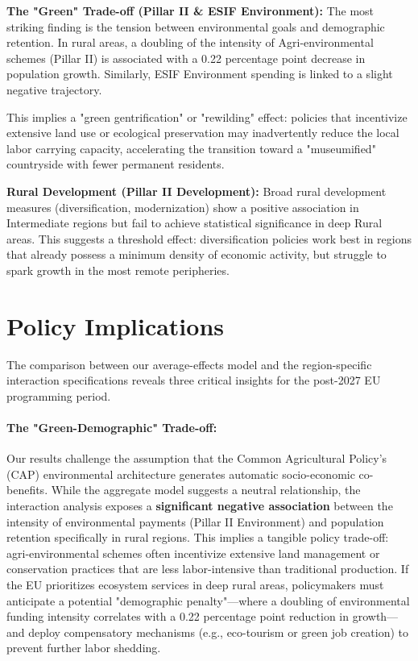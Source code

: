 \documentclass[
	a4paper, %
	10pt, %
]{LTJournalArticle}
\begin{document}
\textbf{The "Green" Trade-off (Pillar II & ESIF Environment):} The most striking finding is the tension between environmental goals and demographic retention. In rural areas, a doubling of the intensity of Agri-environmental schemes (Pillar II) is associated with a 0.22 percentage point decrease in population growth. Similarly, ESIF Environment spending is linked to a slight negative trajectory.

This implies a "green gentrification" or "rewilding" effect: policies that incentivize extensive land use or ecological preservation may inadvertently reduce the local labor carrying capacity, accelerating the transition toward a "museumified" countryside with fewer permanent residents.

\textbf{Rural Development (Pillar II Development):} Broad rural development measures (diversification, modernization) show a positive association in Intermediate regions but fail to achieve statistical significance in deep Rural areas. This suggests a threshold effect: diversification policies work best in regions that already possess a minimum density of economic activity, but struggle to spark growth in the most remote peripheries.


\section{Policy Implications}

The comparison between our average-effects model and the region-specific interaction specifications reveals three critical insights for the post-2027 EU programming period.

\paragraph{The "Green-Demographic" Trade-off:}
Our results challenge the assumption that the Common Agricultural Policy's (CAP) environmental architecture generates automatic socio-economic co-benefits. While the aggregate model suggests a neutral relationship, the interaction analysis exposes a \textbf{significant negative association} between the intensity of environmental payments (Pillar II Environment) and population retention specifically in rural regions. This implies a tangible policy trade-off: agri-environmental schemes often incentivize extensive land management or conservation practices that are less labor-intensive than traditional production. If the EU prioritizes ecosystem services in deep rural areas, policymakers must anticipate a potential "demographic penalty"—where a doubling of environmental funding intensity correlates with a 0.22 percentage point reduction in growth—and deploy compensatory mechanisms (e.g., eco-tourism or green job creation) to prevent further labor shedding.
\end{document}
